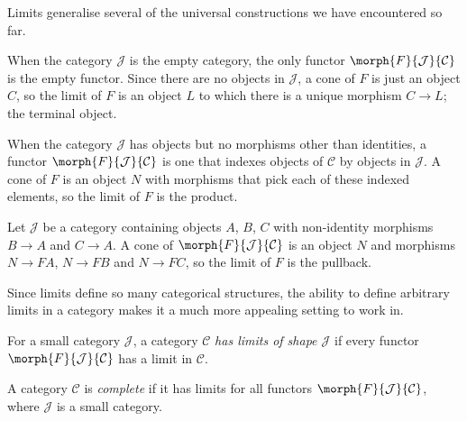 Limits generalise several of the universal constructions we have encountered so
far.

\begin{example}\label{ex:terminal-limit}
    When the category \(\mathcal{J}\) is the empty category, the only functor
    \(\morph{F}{\mathcal{J}}{\mathcal{C}}\) is the empty functor.
    Since there are no objects in \(\mathcal{J}\), a cone of \(F\) is just an
    object \(C\), so the limit of \(F\) is an object \(L\) to which there is a
    unique morphism \(C \to L\); the terminal object.

\end{example}

\begin{example}[Products]\label{ex:product-limit}
    When the category \(\mathcal{J}\) has objects but no morphisms other than
    identities, a functor \(\morph{F}{\mathcal{J}}{\mathcal{C}}\) is one that
    indexes objects of \(\mathcal{C}\) by objects in \(\mathcal{J}\).
    A cone of \(F\) is an object \(N\) with morphisms that pick each of these
    indexed elements, so the limit of \(F\) is the product.
\end{example}

\begin{example}[Pullbacks]\label{ex:pullback-limit}
    Let \(\mathcal{J}\) be a category containing objects \(A\), \(B\),
    \(C\) with non-identity morphisms \(B \to A\) and \(C \to A\).
    A cone of \(\morph{F}{\mathcal{J}}{\mathcal{C}}\) is an object \(N\) and
    morphisms \(N \to FA\), \(N \to FB\) and \(N \to FC\), so the limit of
    \(F\) is the pullback.
\end{example}

Since limits define so many categorical structures, the ability to define
arbitrary limits in a category makes it a much more appealing setting to work
in.

\begin{definition}
    For a small category \(\mathcal{J}\), a category \(\mathcal{C}\)
    \emph{has limits of shape \(\mathcal{J}\)} if every functor
    \(\morph{F}{\mathcal{J}}{\mathcal{C}}\) has a limit in \(\mathcal{C}\).
\end{definition}

\begin{definition}
    A category \(\mathcal{C}\) is \emph{complete} if it has limits for all
    functors \(\morph{F}{\mathcal{J}}{\mathcal{C}}\), where \(\mathcal{J}\) is a
    small category.
\end{definition}

